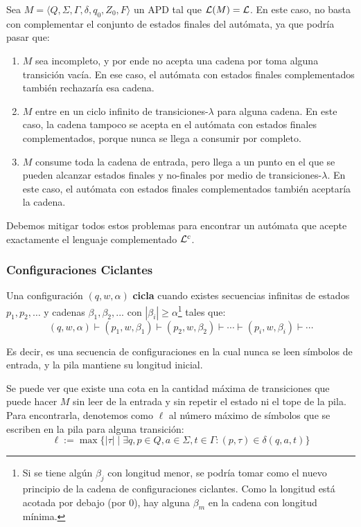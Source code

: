 Sea $M = \langle Q, \Sigma, \Gamma, \delta, q_0, Z_0, F\rangle$ un APD tal que $\mathcal{L}(M) = \mathcal{L}$. En este caso, no basta con complementar el conjunto de estados finales del autómata, ya que podría pasar que:
\begin{enumerate}
    \item $M$ sea incompleto, y por ende no acepta una cadena por toma alguna transición vacía. En ese caso, el autómata con estados finales complementados también rechazaría esa cadena.
    \item $M$ entre en un ciclo infinito de transiciones-$\lambda$ para alguna cadena. En este caso, la cadena tampoco se acepta en el autómata con estados finales complementados, porque nunca se llega a consumir por completo.
    \item $M$ consume toda la cadena de entrada, pero llega a un punto en el que se pueden alcanzar estados finales y no-finales por medio de transiciones-$\lambda$. En este caso, el autómata con estados finales complementados también aceptaría la cadena.
\end{enumerate}

Debemos mitigar todos estos problemas para encontrar un autómata que acepte exactamente el lenguaje complementado $\mathcal{L}^c$. 

\subsubsection{Configuraciones Ciclantes}

Una configuración $(q, w, \alpha)$ \textbf{cicla} cuando existes secuencias infinitas de estados $p_1, p_2, \dots$ y cadenas $\beta_1, \beta_2, ...$ con $|\beta_i| \geq \alpha$\footnote{Si se tiene algún $\beta_j$ con longitud menor, se podría tomar como el nuevo principio de la cadena de configuraciones ciclantes. Como la longitud está acotada por debajo (por $0$), hay alguna $\beta_m$ en la cadena con longitud mínima.} tales que:
$$
    (q, w, \alpha) \vdash (p_1, w, \beta_1) \vdash (p_2, w, \beta_2) \vdash \cdots \vdash (p_i, w, \beta_i) \vdash \cdots
$$

Es decir, es una secuencia de configuraciones en la cual nunca se leen símbolos de entrada, y la pila mantiene su longitud inicial.

Se puede ver que existe una cota en la cantidad máxima de transiciones que puede hacer $M$ sin leer de la entrada y sin repetir el estado ni el tope de la pila. Para encontrarla, denotemos como $\ell$ al número máximo de símbolos que se escriben en la pila para alguna transición:
$$
    \ell := \max \{|\tau| \mid \exists q, p \in Q, a \in \Sigma, t \in \Gamma : (p, \tau) \in \delta(q, a, t)\}
$$

